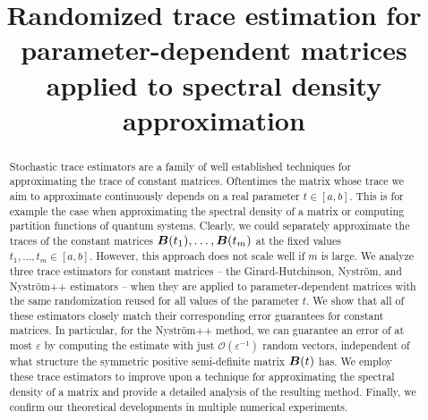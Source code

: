 \documentclass[12pt]{article}
\title{Randomized trace estimation for parameter-dependent matrices applied to spectral density approximation}
\begin{document}
\maketitle



\begin{abstract}
    Stochastic trace estimators are a family of well established techniques for approximating the trace of constant matrices. Oftentimes the matrix whose trace we aim to approximate continuously depends on a real parameter $t \in [a,b]$. This is for example the case when approximating the spectral density of a matrix or computing partition functions of quantum systems. Clearly, we could separately approximate the traces of the constant matrices $\boldsymbol{B}(t_1), \dots, \boldsymbol{B}(t_m)$ at the fixed values $t_1, \dots, t_m \in [a, b]$. However, this approach does not scale well if $m$ is large. We analyze three trace estimators for constant matrices -- the Girard-Hutchinson, Nyström, and Nyström++ estimators -- when they are applied to parameter-dependent matrices with the same randomization reused for all values of the parameter $t$. We show that all of these estimators closely match their corresponding error guarantees for constant matrices. In particular, for the Nyström++ method, we can guarantee an error of at most $\varepsilon$ by computing the estimate with just $\mathcal{O}(\varepsilon^{-1})$ random vectors, independent of what structure the symmetric positive semi-definite matrix $\boldsymbol{B}(t)$ has. We employ these trace estimators to improve upon a technique for approximating the spectral density of a matrix and provide a detailed analysis of the resulting method. Finally, we confirm our theoretical developments in multiple numerical experiments.
\end{abstract}
\end{document}
